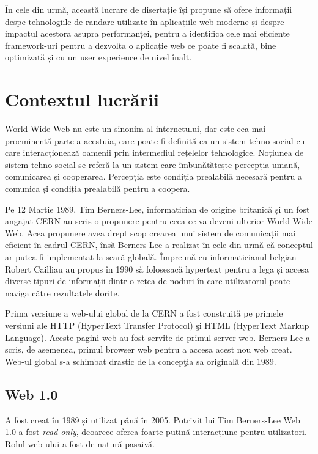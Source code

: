 \documentclass[12pt, a4paper]{report}
\begin{document}
În cele din urmă, această lucrare de disertație își propune să ofere informații despe tehnologiile de randare utilizate în aplicațiile web moderne și despre impactul acestora asupra performanței, pentru a identifica cele mai eficiente framework-uri pentru a dezvolta o aplicație web ce poate fi scalată, bine optimizată și cu un user experience de nivel înalt.


\section{Contextul lucrării}


World Wide Web nu este un sinonim al internetului, dar este cea mai proeminentă parte a acestuia, care poate fi definită ca un sistem tehno-social cu care interacționează oamenii prin intermediul rețelelor tehnologice. Noțiunea de sistem tehno-social se referă la un sistem care îmbunătățește percepția umană, comunicarea și cooperarea. Percepția este condiția prealabilă necesară pentru a comunica și condiția prealabilă pentru a coopera. \cite{theoreticalfundationsoftheweb}

Pe 12 Martie 1989, Tim Berners-Lee, informatician de origine britanică și un fost angajat CERN au scris o propunere pentru ceea ce va deveni ulterior World Wide Web. Acea propunere avea drept scop crearea unui sistem de comunicații mai eficient în cadrul CERN, însă Berners-Lee a realizat în cele din urmă că conceptul ar putea fi implementat la scară globală. Împreună cu informaticianul belgian Robert Cailliau au propus în 1990 să folosesacă hypertext pentru a lega și accesa diverse tipuri de informații dintr-o rețea de noduri în care utilizatorul poate naviga către rezultatele dorite.

Prima versiune a web-ului global de la CERN a fost construit\u a pe primele versiuni ale HTTP (HyperText Transfer Protocol) \c si HTML (HyperText Markup Language). Aceste pagini web au fost servite de primul server web. Berners-Lee a scris, de asemenea, primul browser web pentru a accesa acest nou web creat. Web-ul global s-a schimbat drastic de la concep\c tia sa original\u a din 1989.

\subsection{Web 1.0}

A fost creat în 1989 și utilizat până în 2005. Potrivit lui Tim Berners-Lee Web 1.0 a fost \emph{read-only}, deoarece oferea foarte puțină interacțiune pentru utilizatori. Rolul web-ului a fost de natură pasaivă.
\end{document}
